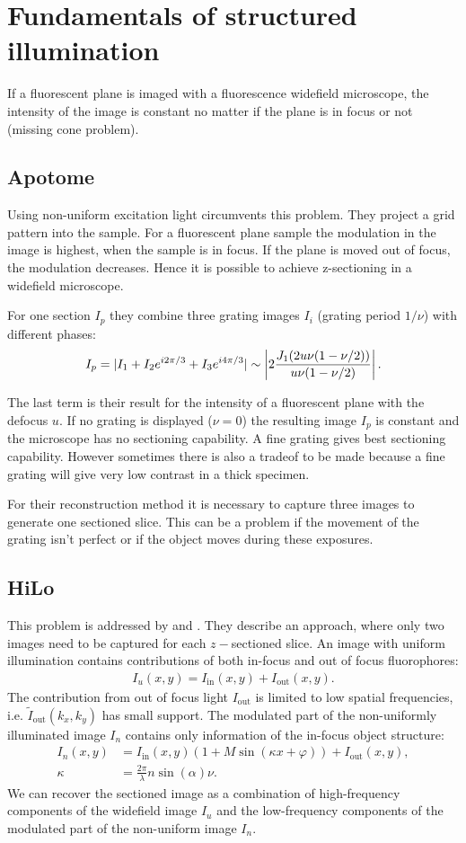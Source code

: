\section{Fundamentals of structured illumination}
If a fluorescent plane is imaged with a fluorescence widefield
microscope, the intensity of the image is constant no matter if the
plane is in focus or not (missing cone problem). 
\subsection{Apotome}
Using non-uniform excitation light \cite{Neil1997} circumvents this
problem. They project a grid pattern into the sample. For a
fluorescent plane sample the modulation in the image is highest, when
the sample is in focus. If the plane is moved out of focus, the
modulation decreases. Hence it is possible to achieve z-sectioning in
a widefield microscope.

For one section $I_p$ they combine three grating images $I_i$ (grating
period $1/\nu$) with different phases:
\begin{align}
  I_p=\mathopen| I_1+I_2e^{i2\pi/3}+I_3e^{i4\pi/3} \mathclose|
  \sim\left| 2 \frac{J_1(2u\nu(1-\nu/2))}{u\nu(1-\nu/2)}\right|.
\end{align}

The last term is their result for the intensity of a fluorescent plane
with the defocus $u$. If no grating is displayed ($\nu=0$) the
resulting image $I_p$ is constant and the microscope has no sectioning
capability. A fine grating gives best sectioning capability. However
sometimes there is also a tradeof to be made because a fine grating
will give very low contrast in a thick specimen.

For their reconstruction method it is necessary to capture three
images to generate one sectioned slice. This can be a problem if the
movement of the grating isn't perfect or if the object moves during
these exposures.
\subsection{HiLo}
This problem is addressed by \cite{2008Lim} and
\cite{2009Santos}. They describe an approach, where only two images
need to be captured for each $z-$sectioned slice.  An image with
uniform illumination contains contributions of both in-focus and out
of focus fluorophores:
\begin{align}
\label{eqn:Iu}
  I_u(x,y)=I_\textrm{in}(x,y)+I_\textrm{out}(x,y).
\end{align}
The contribution from out of focus light $I_\textrm{out}$ is limited
to low spatial frequencies, i.e. $\tilde I_\textrm{out}(k_x,k_y)$ has
small support. The modulated part of the non-uniformly illuminated
image $I_n$ contains only information of the in-focus object
structure:
\begin{align}
\label{eqn:In}
  I_n(x,y)&=I_\textrm{in}(x,y)(1+M
  \sin(\kappa x+\varphi))+I_\textrm{out}(x,y),\\
  \kappa&=\frac{2\pi}{\lambda}n\sin(\alpha)\nu.
\end{align}
We can recover the sectioned image as a combination of high-frequency
components of the widefield image $I_u$ and the low-frequency
components of the modulated part of the non-uniform image $I_n$.
